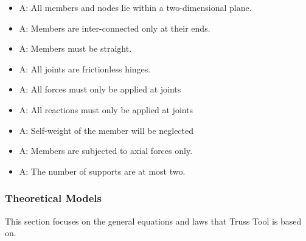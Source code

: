 \documentclass[12pt]{article}
\newcounter{assumpnum} %
\begin{document}
\begin{itemize}

\item{A\theassumpnum \label{planar}: All members and nodes lie within a two-dimensional plane.}

\item{A\theassumpnum \label{connection}: Members are inter-connected only at their ends.}
\item{A\theassumpnum \label{as_straight}: Members must be straight.}
\item{A\theassumpnum \label{frictionless}: All joints are frictionless hinges.}
\item{A\theassumpnum \label{Force_at_joints}: All forces must only be applied at joints}
\item{A\theassumpnum \label{reaction_at_joints}: All reactions must only be applied at joints}
\item{A\theassumpnum \label{self_w}: Self-weight of the member will be neglected}
\item{A\theassumpnum \label{axial_fmem}: Members are subjected to axial forces only.}
\item{A\theassumpnum \label{maxsupport}: The number of supports are at most two.}

\end{itemize}

\subsubsection{Theoretical Models}\label{sec_theoretica}

This section focuses on the general equations and laws that Truss Tool is based on. 

~\newline
\end{document}
